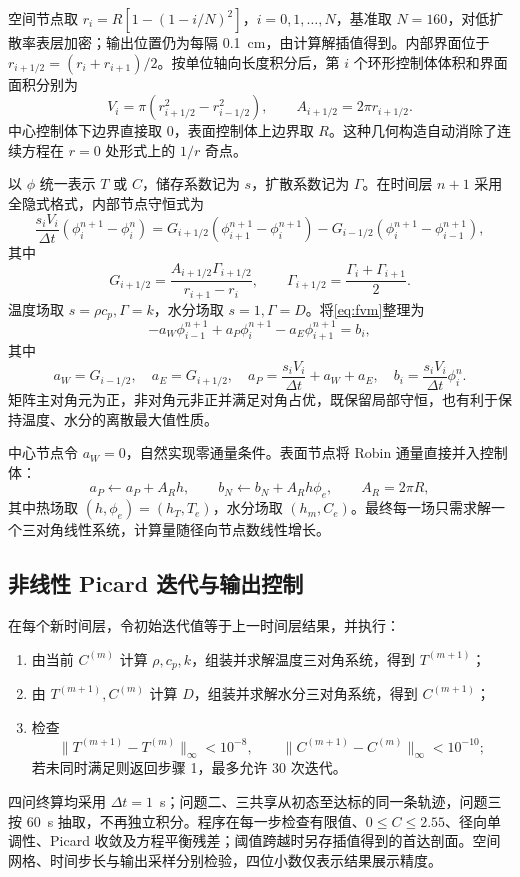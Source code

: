 空间节点取 $r_i=R[1-(1-i/N)^2]$，$i=0,1,\ldots,N$，基准取 $N=160$，对低扩散率表层加密；输出位置仍为每隔 0.1~cm，由计算解插值得到。内部界面位于 $r_{i+1/2}=(r_i+r_{i+1})/2$。按单位轴向长度积分后，第 $i$ 个环形控制体体积和界面面积分别为
\begin{equation}
V_i=\pi(r_{i+1/2}^2-r_{i-1/2}^2),\qquad A_{i+1/2}=2\pi r_{i+1/2}.
\label{eq:cv}
\end{equation}
中心控制体下边界直接取 0，表面控制体上边界取 $R$。这种几何构造自动消除了连续方程在 $r=0$ 处形式上的 $1/r$ 奇点。

以 $\phi$ 统一表示 $T$ 或 $C$，储存系数记为 $s$，扩散系数记为 $\Gamma$。在时间层 $n+1$ 采用全隐式格式，内部节点守恒式为
\begin{equation}
\frac{s_iV_i}{\Delta t}(\phi_i^{n+1}-\phi_i^n)
=G_{i+1/2}(\phi_{i+1}^{n+1}-\phi_i^{n+1})
-G_{i-1/2}(\phi_i^{n+1}-\phi_{i-1}^{n+1}),
\label{eq:fvm}
\end{equation}
其中
\begin{equation}
G_{i+1/2}=\frac{A_{i+1/2}\Gamma_{i+1/2}}{r_{i+1}-r_i},\qquad
\Gamma_{i+1/2}=\frac{\Gamma_i+\Gamma_{i+1}}{2}.
\label{eq:conductance}
\end{equation}
温度场取 $s=\rho c_p,\Gamma=k$，水分场取 $s=1,\Gamma=D$。将\cref{eq:fvm}整理为
\begin{equation}
-a_W\phi_{i-1}^{n+1}+a_P\phi_i^{n+1}-a_E\phi_{i+1}^{n+1}=b_i,
\label{eq:tridiag}
\end{equation}
其中
\[
a_W=G_{i-1/2},\quad a_E=G_{i+1/2},\quad
a_P=\frac{s_iV_i}{\Delta t}+a_W+a_E,\quad
b_i=\frac{s_iV_i}{\Delta t}\phi_i^n.
\]
矩阵主对角元为正，非对角元非正并满足对角占优，既保留局部守恒，也有利于保持温度、水分的离散最大值性质。

中心节点令 $a_W=0$，自然实现零通量条件。表面节点将 Robin 通量直接并入控制体：
\begin{equation}
a_P\leftarrow a_P+A_Rh,\qquad
b_N\leftarrow b_N+A_Rh\phi_e,\qquad A_R=2\pi R,
\label{eq:robindiscrete}
\end{equation}
其中热场取 $(h,\phi_e)=(h_T,T_e)$，水分场取 $(h_m,C_e)$。最终每一场只需求解一个三对角线性系统，计算量随径向节点数线性增长。

\subsection{非线性 Picard 迭代与输出控制}

在每个新时间层，令初始迭代值等于上一时间层结果，并执行：
\begin{enumerate}
  \item 由当前 $C^{(m)}$ 计算 $\rho,c_p,k$，组装并求解温度三对角系统，得到 $T^{(m+1)}$；
  \item 由 $T^{(m+1)},C^{(m)}$ 计算 $D$，组装并求解水分三对角系统，得到 $C^{(m+1)}$；
  \item 检查
  \[
  \|T^{(m+1)}-T^{(m)}\|_\infty<10^{-8},\qquad
  \|C^{(m+1)}-C^{(m)}\|_\infty<10^{-10};
  \]
  若未同时满足则返回步骤 1，最多允许 30 次迭代。
\end{enumerate}

四问终算均采用 $\Delta t=1$~s；问题二、三共享从初态至达标的同一条轨迹，问题三按 60~s 抽取，不再独立积分。程序在每一步检查有限值、$0\le C\le2.55$、径向单调性、Picard 收敛及方程平衡残差；阈值跨越时另存插值得到的首达剖面。空间网格、时间步长与输出采样分别检验，四位小数仅表示结果展示精度。
